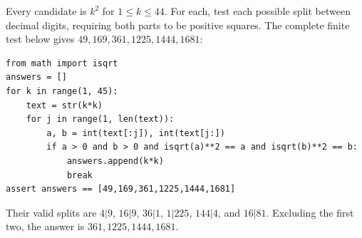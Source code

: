 Every candidate is $k^2$ for $1\le k\le44$. For each, test each possible split between decimal digits, requiring both parts to be positive squares. The complete finite test below gives $49,169,361,1225,1444,1681$:
\begin{verbatim}
from math import isqrt
answers = []
for k in range(1, 45):
    text = str(k*k)
    for j in range(1, len(text)):
        a, b = int(text[:j]), int(text[j:])
        if a > 0 and b > 0 and isqrt(a)**2 == a and isqrt(b)**2 == b:
            answers.append(k*k)
            break
assert answers == [49,169,361,1225,1444,1681]
\end{verbatim}
Their valid splits are $4|9$, $16|9$, $36|1$, $1|225$, $144|4$, and $16|81$. Excluding the first two, the answer is $\boxed{361,1225,1444,1681}$.
